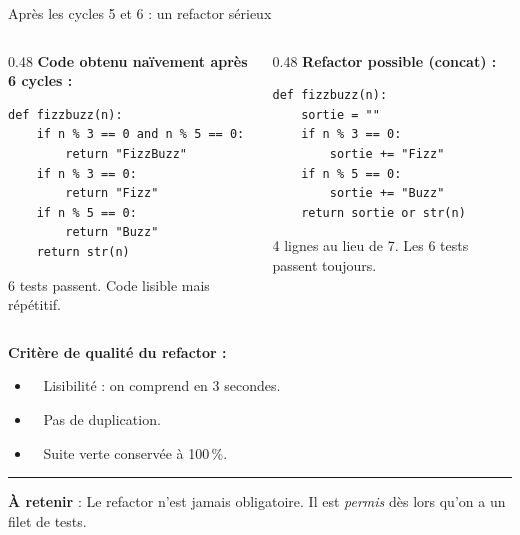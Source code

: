 \documentclass[aspectratio=169,11pt]{beamer}
\newcommand{\takeaway}[1]{%
\vfill\begin{beamercolorbox}[wd=\linewidth,sep=0.4em]{}
\color{accent2}\rule[0.6ex]{1.2em}{1.2pt}\hspace{0.4em}%
\textbf{\color{accent2}\small À retenir} \textcolor{textsoft}{:} %
{\small\color{textmain}#1}
\end{beamercolorbox}}
\newcommand{\oui}[1]{\textcolor{good}{\ding{51}}~#1}
\begin{document}
\begin{frame}[fragile,t,shrink=15]{Après les cycles 5 et 6 : un refactor sérieux}
\begin{columns}[T,onlytextwidth]
\begin{column}{0.48\textwidth}
\textbf{Code obtenu naïvement après 6 cycles :}
\begin{lstlisting}[style=pythondark]
def fizzbuzz(n):
    if n % 3 == 0 and n % 5 == 0:
        return "FizzBuzz"
    if n % 3 == 0:
        return "Fizz"
    if n % 5 == 0:
        return "Buzz"
    return str(n)
\end{lstlisting}
{\color{textsoft}\scriptsize 6 tests passent. Code lisible mais répétitif.}
\end{column}
\begin{column}{0.48\textwidth}
\textbf{Refactor possible (concat) :}
\begin{lstlisting}[style=pythondark]
def fizzbuzz(n):
    sortie = ""
    if n % 3 == 0:
        sortie += "Fizz"
    if n % 5 == 0:
        sortie += "Buzz"
    return sortie or str(n)
\end{lstlisting}
{\color{textsoft}\scriptsize 4 lignes au lieu de 7. Les 6 tests passent toujours.}
\end{column}
\end{columns}
\vspace{0.4cm}
\textbf{Critère de qualité du refactor :}
\begin{itemize}\itemsep0.05em
\item \oui{} Lisibilité : on comprend en 3 secondes.
\item \oui{} Pas de duplication.
\item \oui{} Suite verte conservée à 100\,\%.
\end{itemize}
\takeaway{Le refactor n'est jamais obligatoire. Il est \emph{permis} dès lors qu'on a un filet de tests.}
\end{frame}
\end{document}
